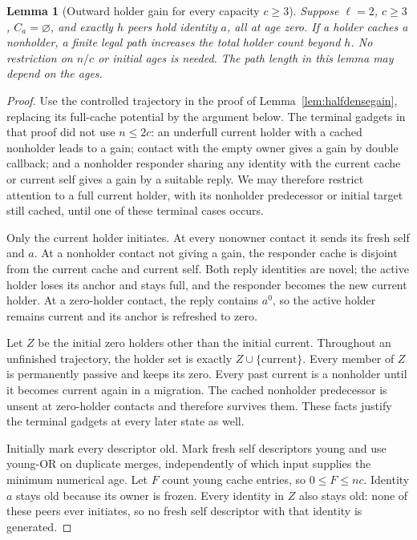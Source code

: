 \documentclass[11pt]{article}
\newtheorem{lemma}[theorem]{Lemma}
\begin{document}
\begin{lemma}[Outward holder gain for every capacity $c\ge3$]
\label{lem:generaloutwardgain}
Suppose $\ell=2$, $c\ge3$, $C_a=\varnothing$, and
exactly $h$ peers hold identity $a$, all at age zero.
If a holder caches a nonholder, a finite legal path
increases the total holder count beyond $h$.
No restriction on $n/c$ or initial ages is needed.
The path length in this lemma may depend on the ages.
\end{lemma}
\begin{proof}
Use the controlled trajectory in the proof of
Lemma~\ref{lem:halfdensegain}, replacing its full-cache
potential by the argument below. The terminal gadgets
in that proof did not use $n\le2c$: an underfull
current holder with a cached nonholder leads to a gain;
contact with the empty owner gives a gain by double
callback; and a nonholder responder sharing any identity
with the current cache or current self gives a gain
by a suitable reply. We may therefore restrict attention
to a full current holder, with its nonholder predecessor
or initial target still cached, until one of these
terminal cases occurs.

Only the current holder initiates. At every nonowner
contact it sends its fresh self and $a$. At a nonholder
contact not giving a gain, the responder cache is
disjoint from the current cache and current self.
Both reply identities are novel; the active holder
loses its anchor and stays full, and the responder
becomes the new current holder. At a zero-holder contact,
the reply contains $a^0$, so the active holder remains
current and its anchor is refreshed to zero.

Let $Z$ be the initial zero holders other than the
initial current. Throughout an unfinished trajectory,
the holder set is exactly $Z\cup\{\text{current}\}$.
Every member of $Z$ is permanently passive and keeps
its zero. Every past current is a nonholder until it
becomes current again in a migration. The cached
nonholder predecessor is unsent at zero-holder contacts
and therefore survives them. These facts justify the
terminal gadgets at every later state as well.

Initially mark every descriptor old. Mark fresh self
descriptors young and use young-OR on duplicate merges,
independently of which input supplies the minimum
numerical age. Let $F$ count young cache entries,
so $0\le F\le nc$. Identity $a$ stays old because
its owner is frozen. Every identity in $Z$ also stays
old: none of these peers ever initiates, so no fresh
self descriptor with that identity is generated.


\end{proof}
\end{document}
